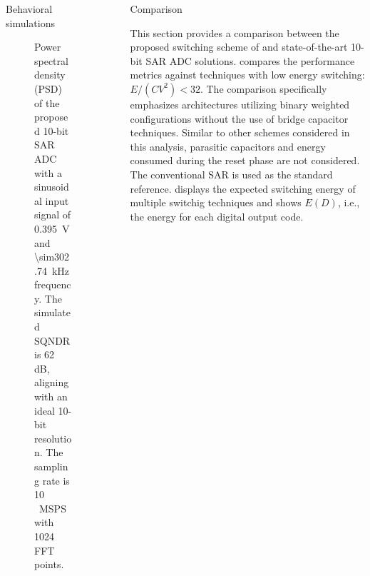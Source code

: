 \documentclass[final]{beamer}
\newlength{\sepwidth}
\newlength{\colwidth}
\newcommand{\separatorcolumn}{\begin{column}{\sepwidth}\end{column}}
\begin{document}
\begin{frame}[t]
\begin{columns}[t]
\begin{column}{\colwidth}
\begin{block}{Behavioral simulations}
    \begin{figure}[t] \centering
        \caption{Power spectral density (PSD) of the proposed 10-bit SAR ADC with a sinusoidal input signal of \SI{0.395}{\V} and \SI{\sim302.74}{\kHz} frequency. The simulated SQNDR is 62 dB, aligning with an ideal 10-bit resolution. The sampling rate is \SI{10}{\,MSPS} with 1024 FFT points.}
        \label{fig:psd}
    \end{figure}

\end{block}


\end{column}

\separatorcolumn

\begin{column}{\colwidth}

    \def\datasetED{datasets_/ED_expanded.csv}
    
    \begin{block}{Comparison}

    This section provides a comparison between the proposed switching scheme of  and state-of-the-art 10-bit SAR ADC solutions. \label{sec:comp} compares the performance metrics against techniques with low energy switching: $E/(C V^2)<32$. The comparison specifically emphasizes architectures utilizing binary weighted configurations without the use of bridge capacitor techniques. Similar to other schemes considered in this analysis, parasitic capacitors and energy consumed during the reset phase are not considered. The conventional SAR is used as the standard reference.  displays the expected switching energy of multiple switchig techniques and  shows $E(D)$, i.e., the energy for each digital output code.
    

\end{block}
\end{column}
\end{columns}
\end{frame}
\end{document}
